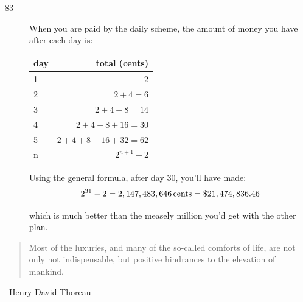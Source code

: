 \documentclass{exam}
\begin{document}
\begin{description}
      \item[83]
        When you are paid by the daily scheme, the amount of money you have after each day is:
        \begin{tabular}[H]{lr}
          \toprule
          day  & total (cents) \\
          \midrule
          1 & $2$ \\
          2 & $2 + 4 = 6$ \\
          3 & $2 + 4 + 8 = 14$ \\
          4 & $2 + 4 + 8 + 16 = 30$ \\
          5 & $2 + 4 + 8 + 16 + 32 = 62$ \\
          n & $2^{n + 1} - 2$ \\
          \bottomrule
        \end{tabular}

        Using the general formula, after day 30, you'll have made:
        \[
          2^{31} - 2 = \unit[2,147,483,646]{cents} = \$21,474,836.46
        \]

        which is much better than the measely million you'd get with the other plan.
    \end{description}

  \else
    \vspace{9 cm}
    \begin{quote}
      \begin{em}
        Most of the luxuries, and many of the so-called comforts of life, are not only not indispensable, but positive
        hindrances to the elevation of mankind.  
      \end{em}
    \end{quote}

    \hspace{1 cm} --Henry David Thoreau
  \fi
\end{document}
